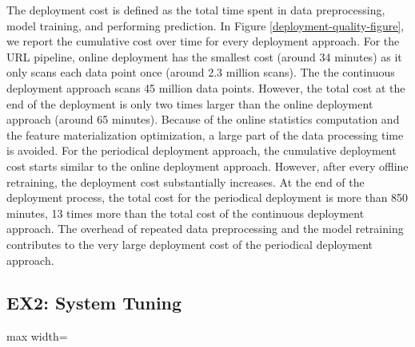 \begin{figure*}[t]
\centering
\resizebox{\textwidth}{!}{}
\caption{Model Quality and Training cost for different deployment approaches}
\label{deployment-quality-figure}
\end{figure*}

The deployment cost is defined as the total time spent in data preprocessing, model training, and performing prediction.
In Figure \ref{deployment-quality-figure}, we report the cumulative cost over time for every deployment approach.
For the URL pipeline, online deployment has the smallest cost (around 34 minutes) as it only scans each data point once (around 2.3 million scans).  
The the continuous deployment approach scans 45 million data points.
However, the total cost at the end of the deployment is only two times larger than the online deployment approach (around 65 minutes).  
Because of the online statistics computation and the feature materialization optimization, a large part of the data processing time is avoided.
For the periodical deployment approach, the cumulative deployment cost starts similar to the online deployment approach.
However, after every offline retraining, the deployment cost substantially increases.
At the end of the deployment process, the total cost for the periodical deployment is more than 850 minutes, 13 times more than the total cost of the continuous deployment approach.
The overhead of repeated data preprocessing and the model retraining contributes to the very large deployment cost of the periodical deployment approach.


\subsection{EX2: System Tuning}
\begin{table*}[t]
\centering
\begin{adjustbox}{max width=\textwidth}

\end{adjustbox}
\caption{Hyperparameter tuning during initial training (bold numbers show the best result for a dataset)}
\label{hyper-param-table}
\end{table*}


